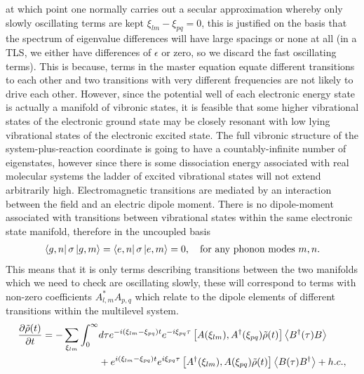 \documentclass[]{article}
\begin{document}
at which point one normally carries out a secular approximation whereby only slowly oscillating terms are kept $\xi_{lm}-\xi_{pq} = 0$, this is justified on the basis that the spectrum of eigenvalue differences will have large spacings or none at all (in a TLS, we either have differences of $\epsilon$ or zero, so we discard the fast oscillating terms). This is because, terms in the master equation equate different transitions to each other and two transitions with very different frequencies are not likely to drive each other. However, since the potential well of each electronic energy state is actually a manifold of vibronic states, it is feasible that some higher vibrational states of the electronic ground state may be closely resonant with low lying vibrational states of the electronic excited state.
The full vibronic structure of the system-plus-reaction coordinate is going to have a countably-infinite number of eigenstates, however since there is some dissociation energy associated with real molecular systems the ladder of excited vibrational states will not extend arbitrarily high. Electromagnetic transitions are mediated by an interaction between the field and an electric dipole moment. There is no dipole-moment associated with transitions between vibrational states within the same electronic state manifold, therefore in the uncoupled basis
\begin{align}
	\begin{split}
		\bra{g,n}\sigma\ket{g,m} = \bra{e,n}\sigma\ket{e,m} = 0, \quad \textnormal{for any phonon modes } m,n.
	\end{split}
\end{align}
This means that it is only terms describing transitions between the two manifolds which we need to check are oscillating slowly, these will correspond to terms with non-zero coefficients $A_{l,m}^{*}A_{p,q}$ which relate to the dipole elements of different transitions within the multilevel system.
\begin{align}
\begin{split}
\pdv{\tilde{\rho}(t)}{t} = - \sum_{\xi_{lm}}\int_{0}^{\infty}& d\tau e^{-i(\xi_{lm}-\xi_{pq})t} e^{-i\xi_{pq}\tau} \left[A(\xi_{lm}), A^{\dagger}(\xi_{pq})\tilde{\rho}(t)\right] \expval{B^{\dagger}(\tau)B} \\
&+ e^{i(\xi_{lm}-\xi_{pq})t} e^{i\xi_{pq}\tau} \left[A^{\dagger}(\xi_{lm}), A(\xi_{pq})\tilde{\rho}(t)\right] \expval{B(\tau)B^{\dagger}} + h.c.,
\end{split}
\end{align}
\end{document}
